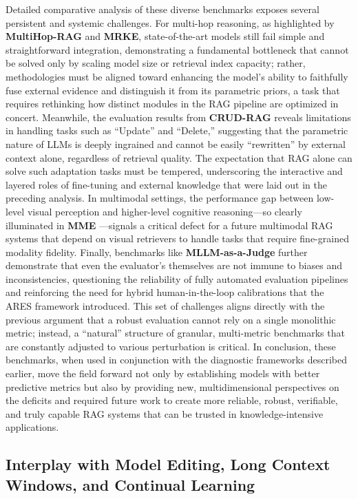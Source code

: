 \documentclass[11pt]{article}
\begin{document}
Detailed comparative analysis of these diverse benchmarks exposes several persistent and systemic challenges. For multi-hop reasoning, as highlighted by \textbf{MultiHop-RAG} and \textbf{MRKE}, state-of-the-art models still fail simple and straightforward integration, demonstrating a fundamental bottleneck that cannot be solved only by scaling model size or retrieval index capacity; rather, methodologies must be aligned toward enhancing the model's ability to faithfully fuse external evidence and distinguish it from its parametric priors, a task that requires rethinking how distinct modules in the RAG pipeline are optimized in concert. Meanwhile, the evaluation results from \textbf{CRUD-RAG} \cite{ref399} reveals limitations in handling tasks such as ``Update'' and ``Delete,'' suggesting that the parametric nature of LLMs is deeply ingrained and cannot be easily ``rewritten'' by external context alone, regardless of retrieval quality. The expectation that RAG alone can solve such adaptation tasks must be tempered, underscoring the interactive and layered roles of fine-tuning and external knowledge that were laid out in the preceding analysis. In multimodal settings, the performance gap between low-level visual perception and higher-level cognitive reasoning---so clearly illuminated in \textbf{MME} \cite{ref420}---signals a critical defect for a future multimodal RAG systems that depend on visual retrievers to handle tasks that require fine-grained modality fidelity. Finally, benchmarks like \textbf{MLLM-as-a-Judge} \cite{ref421} further demonstrate that even the evaluator's themselves are not immune to biases and inconsistencies, questioning the reliability of fully automated evaluation pipelines and reinforcing the need for hybrid human-in-the-loop calibrations that the ARES framework introduced. This set of challenges aligns directly with the previous argument that a robust evaluation cannot rely on a single monolithic metric; instead, a ``natural'' structure of granular, multi-metric benchmarks that are constantly adjusted to various perturbation is critical. In conclusion, these benchmarks, when used in conjunction with the diagnostic frameworks described earlier, move the field forward not only by establishing models with better predictive metrics but also by providing new, multidimensional perspectives on the deficits and required future work to create more reliable, robust, verifiable, and truly capable RAG systems that can be trusted in knowledge-intensive applications.

\subsection{Interplay with Model Editing, Long Context Windows, and Continual Learning}
\end{document}
